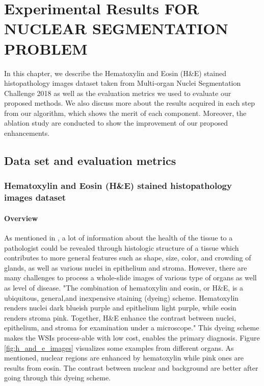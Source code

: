 \chapter{Experimental Results FOR NUCLEAR SEGMENTATION PROBLEM}
\label{chap-experiment} 
\begin{ChapAbstract}
In this chapter, we describe the Hematoxylin and Eosin (H\&E) stained histopathology images dataset taken from Multi-organ Nuclei Segmentation Challenge 2018 as well as the evaluation metrics we used to evaluate our proposed methods. We also discuss more about the results acquired in each step from our algorithm, which shows the merit of each component. Moreover, the ablation study are conducted to show the improvement of our proposed enhancements.
\end{ChapAbstract}

\section{Data set and evaluation metrics}

\subsection{Hematoxylin and Eosin (H\&E) stained histopathology images dataset}

\subsubsection{Overview}
As mentioned in \cite{he_dataset_kumar}, a lot of information
about the health of the tissue to a pathologist could be revealed through histologic structure of a tissue which contributes to more general features such as shape, size, color, and crowding of glands, as well as various nuclei in epithelium and stroma. However, there are many challenges to process a whole-slide images of various type of organs as well as level of disease. "The combination of hematoxylin and eosin, or H\&E, is a ubiquitous, general,and inexpensive staining (dyeing) scheme. Hematoxylin renders nuclei dark blueish purple and epithelium light purple, while eosin renders stroma pink. Together, H\&E enhance the
contrast between nuclei, epithelium, and stroma for examination under a microscope." This dyeing scheme makes the WSIs process-able with low cost, enables the primary diagnosis. Figure \ref{fig:h_and_e_images} visualizes some examples from different organs. As mentioned, nuclear regions are enhanced by hematoxylin while pink ones are results from eosin. The contrast between nuclear and background are better after going through this dyeing scheme.


